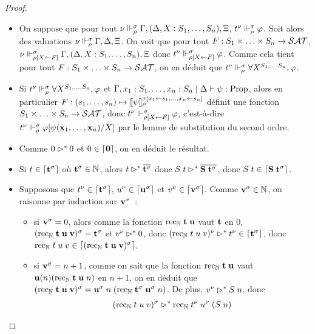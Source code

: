 \documentclass{article}
\begin{document}
\begin{proof}
\begin{itemize}
  \item On suppose que pour tout $\nu\Vdash_\rho^\sigma \Gamma, (\Delta, X : S_1,\ldots,S_n), \Xi$, $t^\nu \Vdash_\rho^\sigma \varphi$. Soit alors des valuations $\nu\Vdash_\rho^\sigma\Gamma, \Delta,\Xi$. On voit que pour tout $F : S_1\times\ldots\times S_n \to \mathcal {SAT}$, $\nu\Vdash_{\rho[X\leftarrow F]}^\sigma \Gamma, (\Delta, X : S_1,\ldots,S_n),\Xi$ donc $t^\nu\Vdash_{\rho[X\leftarrow F]}^\sigma \varphi$. Comme cela tient pour tout $F : S_1\times\ldots\times S_n \to \mathcal {SAT}$, on en déduit que $t^\nu\Vdash_\rho^\sigma \forall X^{S_1,\ldots,S_n}, \varphi$.
  \item Si $t^\nu\Vdash_\rho^\sigma \forall X^{S_1,\ldots,S_n}, \varphi$ et $\Gamma,x_1 : S_1,\ldots,x_n : S_n\mid\Delta\vdash \psi : \mathrm{Prop}$, alors en particulier $F : (s_1,\ldots,s_n) \mapsto \llbracket \psi \rrbracket_\rho^{\sigma[x_1\leftarrow s_1,\ldots, x_n \leftarrow s_n]}$ définit une fonction $S_1\times\ldots\times S_n \to\mathcal {SAT}$, donc $t^\nu\Vdash_{\rho[X\leftarrow F]}^\sigma \varphi$, c'est-à-dire $t^\nu\Vdash_\rho^\sigma \varphi[\psi(\mathbf{x}_1,\ldots,\mathbf{x}_n)/X]$ par le lemme de substitution du second ordre.
  \item Comme $0\rhd^* 0$ et $0\in\lceil \boldsymbol 0 \rceil$, on en déduit le résultat.
  \item Si $t\in\lceil \mathbf{t}^\sigma \rceil$ où $\mathbf{t}^\sigma \in \mathbb{N}$, alors $t\rhd^* \overline{\mathbf{t}^\sigma}$ donc $S\;t\rhd^*\overline{\mathbf{S}\;\mathbf{t}^\sigma}$, donc $S\;t\in\lceil \mathbf{S}\;\mathbf{t}^\sigma \rceil$.
  \item Supposons que $t^\nu\in\lceil \mathbf{t}^\sigma \rceil$, $u^\nu\in\lceil \mathbf{u}^\sigma \rceil$ et $v^\nu\in\lceil \mathbf{v}^\sigma \rceil$. Comme $\mathbf{v}^\sigma\in\mathbb{N}$, on raisonne par induction sur $\mathbf{v}^\sigma$~:
    \begin{itemize}
    \item si $\mathbf{v}^\sigma = 0$, alors comme la fonction $\mathrm{rec}_{\mathbb{N}}\;\mathbf{t}\;\mathbf{u}$ vaut $\mathbf{t}$ en $0$, $(\mathrm{rec}_{\mathbb{N}}\;\mathbf{t}\;\mathbf{u}\;\mathbf{v})^\sigma = \mathbf{t}^\sigma$ et $v^\nu \rhd^* 0$, donc $(\mathrm{rec}_{\mathbb{N}}\;t\;u\;v)^\nu \rhd^* t^\nu \in \lceil \mathbf{t}^\sigma \rceil$, donc $\mathrm{rec}_{\mathbb{N}}\;t\;u\;v \in \lceil (\mathrm{rec}_{\mathbb{N}}\;\mathbf{t}\;\mathbf{u}\;\mathbf{v})^\sigma \rceil$.
    \item si $\mathbf{v}^\sigma = n + 1$, comme on sait que la fonction $\mathrm{rec}_{\mathbb{N}}\;\mathbf{t}\;\mathbf{u}$ vaut $\mathbf{u}(n)(\mathrm{rec}_{\mathbb{N}}\;\mathbf{t}\;\mathbf{u}\;n)$ en $n+1$, on en déduit que $(\mathrm{rec}_{\mathbb{N}}\;\mathbf{t}\;\mathbf{u}\;\mathbf{v})^\sigma = \mathbf{u}^\sigma\;n\;(\mathrm{rec}_{\mathbb{N}}\;\mathbf{t}^\sigma\;\mathbf{u}^\sigma\;n)$. De plus, $v^\nu \rhd^* S\;n$, donc
      \begin{align*}
        (\rec_\bN\;t\;u\;v)^\sigma &\reduc^* \rec_\bN\;t^\nu\;u^\nu\;(S\;n)\\

\end{align*}
\end{itemize}
\end{itemize}
\end{proof}
\end{document}
